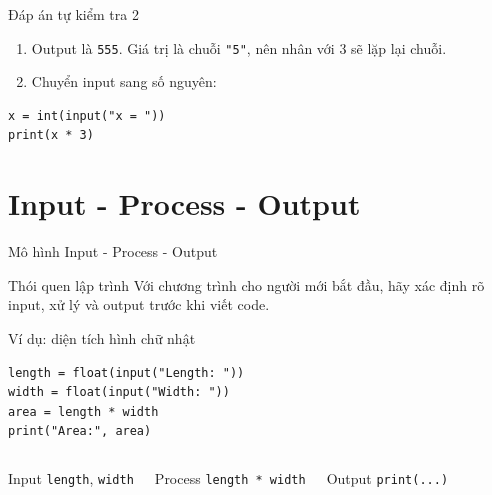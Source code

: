 \documentclass[aspectratio=169,10pt]{beamer}
\begin{document}
\begin{frame}[fragile]{Đáp án tự kiểm tra 2}
\begin{enumerate}
  \item Output là \texttt{555}. Giá trị là chuỗi \texttt{"5"}, nên nhân với 3 sẽ lặp lại chuỗi.
  \item Chuyển input sang số nguyên:
\end{enumerate}
\begin{lstlisting}
x = int(input("x = "))
print(x * 3)
\end{lstlisting}
\end{frame}

\section{Input - Process - Output}

\begin{frame}{Mô hình Input - Process - Output}
\begin{center}
\end{center}
\begin{block}{Thói quen lập trình}
Với chương trình cho người mới bắt đầu, hãy xác định rõ input, xử lý và output trước khi viết code.
\end{block}
\end{frame}

\begin{frame}[fragile]{Ví dụ: diện tích hình chữ nhật}
\begin{lstlisting}
length = float(input("Length: "))
width = float(input("Width: "))
area = length * width
print("Area:", area)
\end{lstlisting}
\begin{columns}[T,onlytextwidth]
\begin{block}{Input}
\texttt{length}, \texttt{width}
\end{block}
\begin{block}{Process}
\texttt{length * width}
\end{block}
\begin{block}{Output}
\texttt{print(...)}
\end{block}
\end{columns}
\end{frame}
\end{document}
